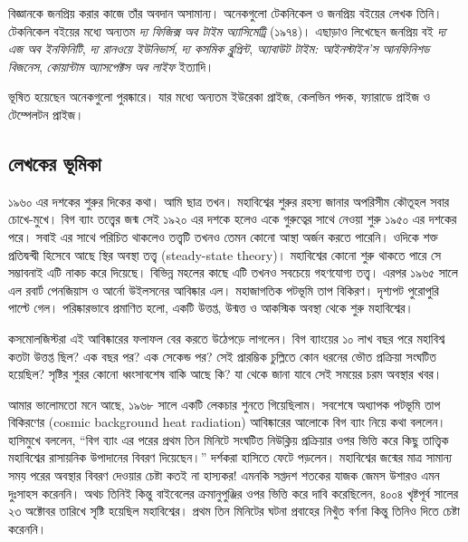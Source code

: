 \documentclass[
]{book}
\begin{document}
বিজ্ঞানকে জনপ্রিয় করার কাজে তাঁর অবদান অসামান্য। অনেকগুলো টেকনিকেল ও জনপ্রিয় বইয়ের লেখক তিনি। টেকনিকেল বইয়ের মধ্যে অন্যতম \emph{দ্য ফিজিক্স অব টাইম অ্যাসিমেট্রি} (১৯৭৪)। এছাড়াও লিখেছেন জনপ্রিয় বই \emph{দ্য এজ অব ইনফিনিটি}, \emph{দ্য রানওয়ে ইউনিভার্স}, \emph{দ্য কসমিক ব্লুপ্রিন্ট}, \emph{অ্যাবাউট টাইম: আইনস্টাইন'স আনফিনিশড বিজনেস}, \emph{কোয়ান্টাম অ্যাসপেক্টস অব লাইফ} ইত্যাদি।

ভূষিত হয়েছেন অনেকগুলো পুরষ্কারে। যার মধ্যে অন্যতম ইউরেকা প্রাইজ, কেলভিন পদক, ফ্যারাডে প্রাইজ ও টেম্পেলটন প্রাইজ।

\hypertarget{ux9b2ux9c7ux996ux995ux9c7ux9b0-ux9adux9c2ux9aeux9bfux995ux9be}{%
\subsection{লেখকের ভূমিকা}\label{ux9b2ux9c7ux996ux995ux9c7ux9b0-ux9adux9c2ux9aeux9bfux995ux9be}}

১৯৬০ এর দশকের শুরুর দিকের কথা। আমি ছাত্র তখন। মহাবিশ্বের শুরুর রহস্য জানার অপরিসীম কৌতূহল সবার চোখে-মুখে। বিগ ব্যাং তত্ত্বের জন্ম সেই ১৯২০ এর দশকে হলেও একে গুরুত্বের সাথে নেওয়া শুরু ১৯৫০ এর দশকের পরে। সবাই এর সাথে পরিচিত থাকলেও তত্ত্বটি তখনও তেমন কোনো আস্থা অর্জন করতে পারেনি। ওদিকে শক্ত প্রতিদ্বন্দ্বী হিসেবে আছে স্থির অবস্থা তত্ত্ব (steady-state theory)। মহাবিশ্বের কোনো শুরু থাকতে পারে সে সম্ভাবনাই এটি নাকচ করে দিয়েছে। বিভিন্ন মহলের কাছে এটি তখনও সবচেয়ে গহণযোগ্য তত্ত্ব। এরপর ১৯৬৫ সালে এল রবার্ট পেনজিয়াস ও আর্নো উইলসনের আবিষ্কার এল। মহাজাগতিক পটভূমি তাপ বিকিরণ। দৃশ্যপট পুরোপুরি পাল্টে গেল। পরিষ্কারভাবে প্রমাণিত হলো, একটি উত্তপ্ত, উন্মত্ত ও আকস্মিক অবস্থা থেকে শুরু মহাবিশ্বের।

কসমোলজিস্টরা এই আবিষ্কারের ফলাফল বের করতে উঠেপড়ে লাগলেন। বিগ ব্যাংয়ের ১০ লাখ বছর পরে মহাবিশ্ব কতটা উত্তপ্ত ছিল? এক বছর পর? এক সেকেন্ড পর? সেই প্রারম্ভিক চুল্লিতে কোন ধরনের ভৌত প্রক্রিয়া সংঘটিত হয়েছিল? সৃষ্টির শুরর কোনো ধ্বংসাবশেষ বাকি আছে কি? যা থেকে জানা যাবে সেই সময়ের চরম অবস্থার খবর।

আমার ভালোমতো মনে আছে, ১৯৬৮ সালে একটি লেকচার শুনতে গিয়েছিলাম। সবশেষে অধ্যাপক পটভূমি তাপ বিকিরণের (cosmic background heat radiation) আবিষ্কারের আলোকে বিগ ব্যাং নিয়ে কথা বললেন। হাসিমুখে বললেন, ``বিগ ব্যাং এর পরের প্রথম তিন মিনিটে সংঘটিত নিউক্লিয় প্রক্রিয়ার ওপর ভিত্তি করে কিছু তাত্ত্বিক মহাবিশ্বের রাসায়নিক উপাদানের বিবরণ দিয়েছেন।'' দর্শকরা হাসিতে ফেটে পড়লেন। মহাবিশ্বের জন্মের মাত্র সামান্য সময় পরের অবস্থার বিবরণ দেওয়ার চেষ্টা কতই না হাস্যকর! এমনকি সপ্তদশ শতকের যাজক জেমস উশারও এমন দুঃসাহস করেননি। অথচ তিনিই কিন্তু বাইবেলের ক্রমানুপুঞ্জির ওপর ভিত্তি করে দাবি করেছিলেন, ৪০০৪ খৃষ্টপূর্ব সালের ২৩ অক্টোবর তারিখে সৃষ্টি হয়েছিল মহাবিশ্বের। প্রথম তিন মিনিটের ঘটনা প্রবাহের নিখুঁত বর্ণনা কিন্তু তিনিও দিতে চেষ্টা করেননি।
\end{document}
